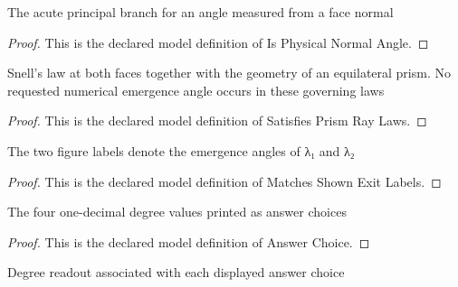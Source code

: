 \begin{definition}
  \label{def:physics:phyx-mini-0150:phyxminiproblems-problemphyxmini0150-isphysicalnormalangle}
  The acute principal branch for an angle measured from a face normal
\end{definition}
\begin{proof}
  This is the declared model definition of Is Physical Normal Angle.
\end{proof}
\begin{definition}
  \label{def:physics:phyx-mini-0150:phyxminiproblems-problemphyxmini0150-satisfiesprismraylaws}
  Snell's law at both faces together with the geometry of an equilateral prism. No requested numerical emergence angle occurs in these governing laws
\end{definition}
\begin{proof}
  This is the declared model definition of Satisfies Prism Ray Laws.
\end{proof}
\begin{definition}
  \label{def:physics:phyx-mini-0150:phyxminiproblems-problemphyxmini0150-matchesshownexitlabels}
  The two figure labels denote the emergence angles of λ₁ and λ₂
\end{definition}
\begin{proof}
  This is the declared model definition of Matches Shown Exit Labels.
\end{proof}
\begin{definition}
  \label{def:physics:phyx-mini-0150:phyxminiproblems-problemphyxmini0150-answerchoice}
  The four one-decimal degree values printed as answer choices
\end{definition}
\begin{proof}
  This is the declared model definition of Answer Choice.
\end{proof}
\begin{definition}
  \label{def:physics:phyx-mini-0150:phyxminiproblems-problemphyxmini0150-answerangledegrees}
  Degree readout associated with each displayed answer choice
\end{definition}
